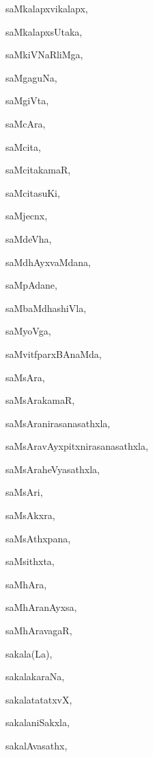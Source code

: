 \begin{multicols}{2}
{saMkalapxvikalapx}, \pageref{saMkalapxvikalapx}

{saMkalapxsUtaka}, \pageref{saMkalapxsUtaka}

{saMkiVNaRliMga}, \pageref{saMkiVNaRliMga}

{saMgaguNa}, \pageref{saMgaguNa}

{saMgiVta}, \pageref{saMgiVta}

{saMcAra}, \pageref{saMcAra}

{saMcita}, \pageref{saMcita}

{saMcitakamaR}, \pageref{saMcitakamaR}

{saMcitasuKi}, \pageref{saMcitasuKi}

{saMjecnx}, \pageref{saMjecnx}

{saMdeVha}, \pageref{saMdeVha}

{saMdhAyxvaMdana}, \pageref{saMdhAyxvaMdana}

{saMpAdane}, \pageref{saMpAdane}

{saMbaMdhashiVla}, \pageref{saMbaMdhashiVla}

{saMyoVga}, \pageref{saMyoVga}

{saMvitfparxBAnaMda}, \pageref{saMvitfparxBAnaMda}

{saMsAra}, \pageref{saMsAra}

{saMsArakamaR}, \pageref{saMsArakamaR}

{saMsAranirasanasathxla}, \pageref{saMsAranirasanasathxla}

{saMsAravAyxpitxnirasanasathxla}, \pageref{saMsAravAyxpitxnirasanasathxla}

{saMsAraheVyasathxla}, \pageref{saMsAraheVyasathxla}

{saMsAri}, \pageref{saMsAri}

{saMsAkxra}, \pageref{saMsAkxra}

{saMsAthxpana}, \pageref{saMsAthxpana}

{saMsithxta}, \pageref{saMsithxta}

{saMhAra}, \pageref{saMhAra}

{saMhAranAyxsa}, \pageref{saMhAranAyxsa}

{saMhAravagaR}, \pageref{saMhAravagaR}

{sakala(La)}, \pageref{sakalaLa}

{sakalakaraNa}, \pageref{sakalakaraNa}

{sakalatatatxvX}, \pageref{sakalatatatxvX}

{sakalaniSakxla}, \pageref{sakalaniSakxla}

{sakalAvasathx}, \pageref{sakalAvasathx}


\end{multicols}
